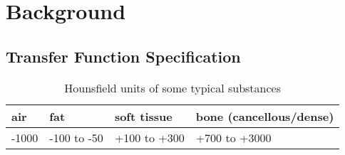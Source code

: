 \section{Background}
\label{sec:background}
\subsection{Transfer Function Specification}



\begin{table}
\centering
\normalsize
\begin{tabular}{llll}
\hline
air & fat & soft tissue & bone (cancellous/dense)\\
\hline
-1000 & -100 to -50 & +100 to +300 & +700 to +3000\\
\hline
\end{tabular}
\caption{Hounsfield units of some typical substances \cite{feeman_mathematics_2009}}
\label{table:Hounsfield_unit}
\end{table}

